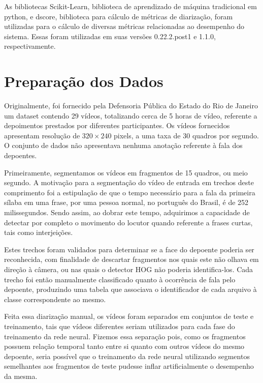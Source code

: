 As bibliotecas Scikit-Learn\cite{pedregosaScikitlearnMachineLearning2011}, biblioteca de aprendizado de máquina tradicional em python, e dscore\cite{ryantNryantDscore2020}, biblioteca para cálculo de métricas de diarização, foram utilizadas para o cálculo de diversas métricas relacionadas ao desempenho do sistema.
Essas foram utilizadas em suas versões 0.22.2.post1 e 1.1.0, respectivamente.

\section{Preparação dos Dados}
\label{sec:preproc}

Originalmente, foi fornecido pela Defensoria Pública do Estado do Rio de Janeiro um dataset contendo 29 vídeos, totalizando cerca de 5 horas de vídeo, referente a depoimentos prestados por diferentes participantes.
Os vídeos fornecidos apresentam resolução de $320\times240$ pixels, a uma taxa de 30 quadros por segundo.
O conjunto de dados não apresentava nenhuma anotação referente à fala dos depoentes.

Primeiramente, segmentamos os vídeos em fragmentos de 15 quadros, ou meio segundo.
A motivação para a segmentação do vídeo de entrada em trechos deste comprimento foi a estipulação de que o tempo necessário para a fala da primeira sílaba em uma frase, por uma pessoa normal, no português do Brasil, é de 252 milissegundos\cite{barbosaSyllabletimingBrazilianPortuguese2000}.
Sendo assim, ao dobrar este tempo, adquirimos a capacidade de detectar por completo o movimento do locutor quando referente a frases curtas, tais como interjeições.

Estes trechos foram validados para determinar se a face do depoente poderia ser reconhecida, com finalidade de descartar fragmentos nos quais este não olhava em direção à câmera, ou nas quais o detector HOG não poderia identifica-los.
Cada trecho foi então manualmente classificado quanto à ocorrência de fala pelo depoente, produzindo uma tabela que associava o identificador de cada arquivo à classe correspondente ao mesmo.

Feita essa diarização manual, os vídeos foram separados em conjuntos de teste e treinamento, tais que vídeos diferentes seriam utilizados para cada fase do treinamento da rede neural.
Fizemos essa separação pois, como os fragmentos possuem relação temporal tanto entre si quanto com outros vídeos do mesmo depoente, seria possível que o treinamento da rede neural utilizando segmentos semelhantes aos fragmentos de teste pudesse inflar artificialmente o desempenho da mesma.

